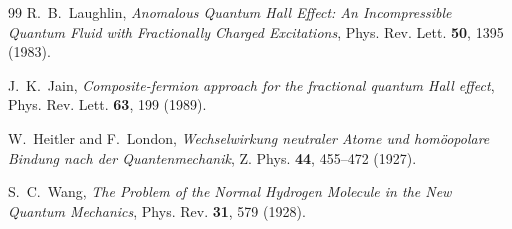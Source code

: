 \documentclass[11pt,a4paper,oneside]{article}
\theoremstyle{plain}
\theoremstyle{definition}
\theoremstyle{remark}
\numberwithin{equation}{section}
\begin{document}
\begin{thebibliography}{99}
R.~B.~Laughlin, \emph{Anomalous Quantum Hall Effect: An Incompressible Quantum Fluid with Fractionally Charged Excitations}, Phys. Rev. Lett. \textbf{50}, 1395 (1983).

J.~K.~Jain, \emph{Composite-fermion approach for the fractional quantum Hall effect}, Phys. Rev. Lett. \textbf{63}, 199 (1989).

W.~Heitler and F.~London, \emph{Wechselwirkung neutraler Atome und hom\"oopolare Bindung nach der Quantenmechanik}, Z. Phys. \textbf{44}, 455--472 (1927).

S.~C.~Wang, \emph{The Problem of the Normal Hydrogen Molecule in the New Quantum Mechanics}, Phys. Rev. \textbf{31}, 579 (1928).

\end{thebibliography}
\end{document}
